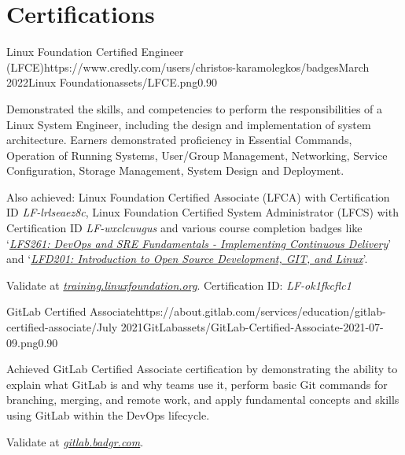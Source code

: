 \documentclass{mycv}
\begin{document}
	\section{Certifications}
    \begin{EntryDatedLogo}{Linux Foundation Certified Engineer (LFCE)}{https://www.credly.com/users/christos-karamolegkos/badges}{March 2022}{Linux Foundation}{assets/LFCE.png}{0.90}
		\begin{Itemize}
			\item Demonstrated the skills, and competencies to perform the responsibilities of a Linux System Engineer, including the design and implementation of system architecture. Earners demonstrated proficiency in Essential Commands, Operation of Running Systems, User/Group Management, Networking, Service Configuration, Storage Management, System Design and Deployment.
			\item Also achieved: Linux Foundation Certified Associate (LFCA) with Certification ID \textit{LF-lrlseaez8c}, Linux Foundation Certified System Administrator (LFCS) with Certification ID \textit{LF-wxclcuugus} and various course completion badges like `\href{https://www.credly.com/badges/19ff66ca-2e10-4e1b-90a9-1c1ac6132878}{\textit{LFS261: DevOps and SRE Fundamentals - Implementing Continuous Delivery}}' and   `\href{https://www.credly.com/badges/1fc7edfc-227e-4e93-ac46-297ab05c27db}{\textit{LFD201: Introduction to Open Source Development, GIT, and Linux}}'.
		\end{Itemize}
		\vspace{-0.3cm}
		Validate at \href{https://training.linuxfoundation.org/certification/verify-linux-certifications}{\textit{training.linuxfoundation.org}}. Certification ID: \textit{LF-ok1fkcflc1}
	\end{EntryDatedLogo}

	\vspace{0.5cm}

    \begin{EntryDatedLogo}{GitLab Certified Associate}{https://about.gitlab.com/services/education/gitlab-certified-associate/}{July 2021}{GitLab}{assets/GitLab-Certified-Associate-2021-07-09.png}{0.90}
		\begin{Itemize}
			\item Achieved GitLab Certified Associate certification by demonstrating the ability to explain what GitLab is and why teams use it, perform basic Git commands for branching, merging, and remote work, and apply fundamental concepts and skills using GitLab within the DevOps lifecycle.
		\end{Itemize}
		\vspace{-0.3cm}
		Validate at \href{https://gitlab.badgr.com/public/assertions/Hw6j8Th9SyKNj8ehsQkqAw}{\textit{gitlab.badgr.com}}.
	\end{EntryDatedLogo}
\end{document}
